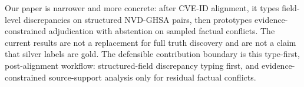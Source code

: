 Our paper is narrower and more concrete: after CVE-ID alignment, it types field-level discrepancies on structured NVD-GHSA pairs, then prototypes evidence-constrained adjudication with abstention on sampled factual conflicts. The current results are not a replacement for full truth discovery and are not a claim that silver labels are gold. The defensible contribution boundary is this type-first, post-alignment workflow: structured-field discrepancy typing first, and evidence-constrained source-support analysis only for residual factual conflicts.
